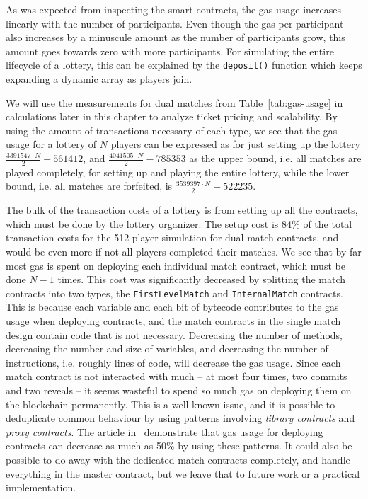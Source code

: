 As was expected from inspecting the smart contracts, the gas usage increases linearly with the number of participants. Even though the gas per participant also increases by a minuscule amount as the number of participants grow, this amount goes towards zero with more participants. For simulating the entire lifecycle of a lottery, this can be explained by the \texttt{deposit()} function which keeps expanding a dynamic array as players join. 

We will use the measurements for dual matches from Table~\ref{tab:gas-usage} in calculations later in this chapter to analyze ticket pricing and scalability. By using the amount of transactions necessary of each type, we see that the gas usage for a lottery of $N$ players can be expressed as for just setting up the lottery $\frac{3391547 \cdot N}{2} - 561412$, and $\frac{4041505 \cdot N}{2} - 785353$ as the upper bound, i.e. all matches are played completely, for setting up and playing the entire lottery, while the lower bound, i.e. all matches are forfeited, is $\frac{3539397 \cdot N}{2} - 522235$.

The bulk of the transaction costs of a lottery is from setting up all the contracts, which must be done by the lottery organizer. The setup cost is 84\% of the total transaction costs for the 512 player simulation for dual match contracts, and would be even more if not all players completed their matches. We see that by far most gas is spent on deploying each individual match contract, which must be done $N-1$ times. This cost was significantly decreased by splitting the match contracts into two types, the \texttt{FirstLevelMatch} and \texttt{InternalMatch} contracts. This is because each variable and each bit of bytecode contributes to the gas usage when deploying contracts, and the match contracts in the single match design contain code that is not necessary. Decreasing the number of methods, decreasing the number and size of variables, and decreasing the number of instructions, i.e. roughly lines of code, will decrease the gas usage. Since each match contract is not interacted with much – at most four times, two commits and two reveals – it seems wasteful to spend so much gas on deploying them on the blockchain permanently. This is a well-known issue, and it is possible to deduplicate common behaviour by using patterns involving \emph{library contracts} and \emph{proxy contracts}. The article in~\cite{lu_solidity_2018} demonstrate that gas usage for deploying contracts can decrease as much as 50\% by using these patterns. It could also be possible to do away with the dedicated match contracts completely, and handle everything in the master contract, but we leave that to future work or a practical implementation.

